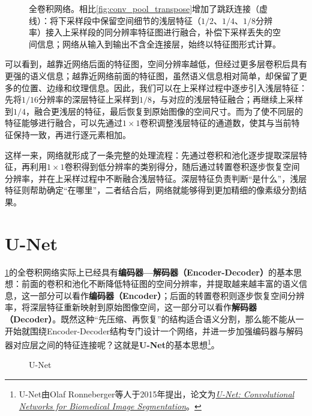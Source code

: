 \begin{figure}[H]
    \caption{全卷积网络。相比\cref{fig:conv_pool_transpose}增加了跳跃连接（虚线）：将下采样段中保留空间细节的浅层特征（$1/2$、$1/4$、$1/8$分辨率）接入上采样段的同分辨率特征图进行融合，补偿下采样丢失的空间信息；网络从输入到输出不含全连接层，始终以特征图形式计算。}
    \label{fig:full_convolution_network}
\end{figure}

可以看到，越靠近网络后面的特征图，空间分辨率越低，但经过更多层卷积后具有更强的语义信息；越靠近网络前面的特征图，虽然语义信息相对简单，却保留了更多的位置、边缘和纹理信息。因此，我们可以在上采样过程中逐步引入浅层特征：先将$1/16$分辨率的深层特征上采样到$1/8$，与对应的浅层特征融合；再继续上采样到$1/4$，融合更浅层的特征，最后恢复到原始图像的空间尺寸。而为了使不同层的特征能够进行融合，可以先通过$1\times1$卷积调整浅层特征的通道数，使其与当前特征保持一致，再进行逐元素相加。

这样一来，网络就形成了一条完整的处理流程：先通过卷积和池化逐步提取深层特征，再利用$1\times1$卷积得到低分辨率的类别得分，随后通过转置卷积逐步恢复空间分辨率，并在上采样过程中不断融合浅层特征。深层特征负责判断“是什么”，浅层特征则帮助确定“在哪里”，二者结合后，网络就能够得到更加精细的像素级分割结果。

\section{U-Net}

\cref{fig:full_convolution_network}的全卷积网络实际上已经具有\textbf{编码器—解码器（Encoder-Decoder）}的基本思想：前面的卷积和池化不断降低特征图的空间分辨率，并提取越来越丰富的语义信息，这一部分可以看作\textbf{编码器（Encoder）}；后面的转置卷积则逐步恢复空间分辨率，将深层特征重新映射到原始图像空间，这一部分可以看作\textbf{解码器（Decoder）}。既然这种“先压缩、再恢复”的结构适合语义分割，那么能不能从一开始就围绕Encoder-Decoder结构专门设计一个网络，并进一步加强编码器与解码器对应层之间的特征连接呢？这就是\textbf{U-Net}的基本思想\footnote{U-Net由Olaf Ronneberger等人于2015年提出，论文为\href{https://arxiv.org/abs/1505.04597}{\textit{U-Net: Convolutional Networks for Biomedical Image Segmentation}}。}。

\begin{figure}[H]
    \caption{U-Net}
    \label{fig:unet}
\end{figure}

